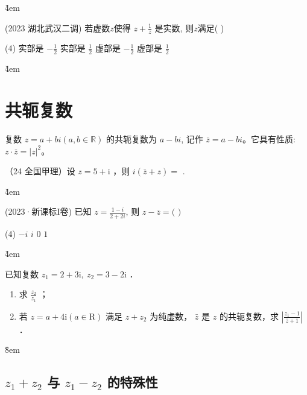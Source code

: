 \v{4em}

\begin{example}(2023 湖北武汉二调)
    若虚数$z$使得 $z+\frac{1}{z}$ 是实数, 则$z$满足( \quad )
    \begin{tasks}(4)
        \task 实部是 $-\frac{1}{2}$
        \task 实部是 $\frac{1}{2}$
        \task 虚部是 $-\frac{1}{2}$
        \task 虚部是 $\frac{1}{2}$
    \end{tasks}
\end{example}

\v{4em}

\section{共轭复数}

\begin{definition}[共轭复数]
    复数 $z=a+bi(a,b\in \mathbb{R})$ 的共轭复数为 $a-bi$, 记作 $\overline{z}=a-bi$。它具有性质: $z\cdot\overline{z}=|z|^{2}$。
\end{definition}

\begin{example}
    （24 全国甲理）设 $z=5+\mathrm{i}$ ，则 $i(\bar{z}+z)=$ \underline{\qquad}.
\end{example}

\v{4em}

\begin{example}(2023·新课标I卷)
    已知 $z=\frac{1-i}{2+2i}$, 则 $z-\overline{z}=($ \quad $)$
    \begin{tasks}(4)
        \task $-i$
        \task $i$
        \task $0$
        \task $1$
    \end{tasks}
\end{example}

\v{4em}

\begin{example}
    已知复数 $z_1=2+3 \mathrm{i}, ~ z_2=3-2 \mathrm{i}$ ．
    \begin{enumerate}
        \item 求 $\frac{z_2}{z_1}$ ；
        \item 若 $z=a+4 \mathrm{i}(a \in \mathrm{R})$ 满足 $z+z_2$ 为纯虚数， $\bar{z}$ 是 $z$ 的共轭复数，求 $\left|\frac{z_1-1}{\bar{z}+1}\right|$ ．
    \end{enumerate}
\end{example}

\v{8em}

\subsection{$z_1 + z_2$ 与 $z_1 - z_2$ 的特殊性}

